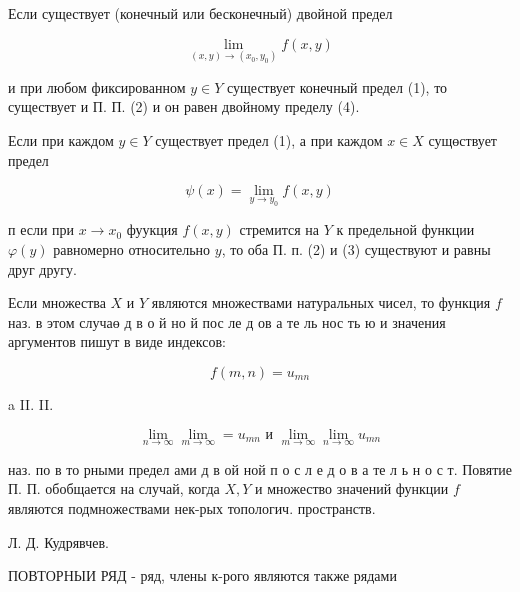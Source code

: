 \documentclass[10pt]{article}
\begin{document}
Если существует (конечный или бесконечный) двойной предел



\[

\lim _{(x, y) \rightarrow\left(x_{0}, y_{0}\right)} f(x, y)

\]



и при любом фиксированном $y \in Y$ существует конечный предел (1), то существует и П. П. (2) и он равен двойному пределу (4).



Если при каждом $y \in Y$ существует предел (1), а при каждом $x \in X$ сущөствует предел



\[

\psi(x)=\lim _{y \rightarrow y_{0}} f(x, y)

\]



п если при $x \rightarrow x_{0}$ фуукция $f(x, y)$ стремится на $Y$ к предельной функции $\varphi(y)$ равномерно относительно $y$, то оба П. п. (2) и (3) существуют и равны друг другу.



Если множества $X$ и $Y$ являются множествами натуральных чисел, то функция $f$ наз. в этом случаө д в о й но й пос ле д ов а те ль нос ть ю и значения аргументов пишут в виде индексов:



\[

f(m, n)=u_{m n}

\]



a II. II.



\[

\lim _{n \rightarrow \infty} \lim _{m \rightarrow \infty}=u_{m n} \text { и } \lim _{m \rightarrow \infty} \lim _{n \rightarrow \infty} u_{m n}

\]



наз. по в то рными предел ами д в ой ной п о с л е д о в а те л ь н о с т. Повятие П. П. обобщается на случай, когда $X, Y$ и множество значений функции $f$ являются подмножествами нек-рых топологич. пространств.



Л. Д. Кудрявчев.



ПОВТОРНЫИ РЯД - ряд, члены к-рого являются также рядами
\end{document}

